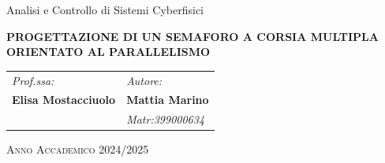 \vspace{0.25cm}

%
%
\begin{center}
    Analisi e Controllo di Sistemi Cyberfisici
    
	{\LARGE \textbf{PROGETTAZIONE DI UN SEMAFORO A CORSIA MULTIPLA ORIENTATO AL PARALLELISMO} \smallskip\\}                                               
\end{center}

\vspace{2cm}
\begin{tabular}{ll}
	\textit{Prof.ssa:}        \hspace{3cm}   	& \textit{Autore:}\\
	\textbf{Elisa Mostacciuolo}      \hspace{5cm}     & \textbf{Mattia Marino}\\   
	\hspace{3cm}      & \textit{Matr:399000634}                                       					   
\end{tabular}

\vspace{2.5cm}
\begin{center}
	\textsc{Anno Accademico 2024/2025}
\end{center}

\newpage
